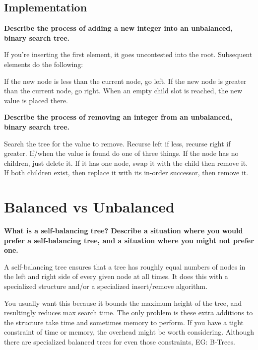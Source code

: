 \documentclass[12pt, letterpaper]{article}
\newcommand{\question}[1]{\textbf{#1}\par}
\newenvironment{answerblock}{\color{Green4}}{\normalcolor\vspace{1em}}
\begin{document}
\subsection{Implementation}

\question{Describe the process of adding a new integer into an unbalanced,
binary search tree.}

\begin{answerblock}
If you're inserting the first element, it goes uncontested into the root.
Subsequent elements do the following:

If the new node is less than the current node, go left. If the new node is
greater than the current node, go right. When an empty child slot is reached,
the new value is placed there.
\end{answerblock}

\question{Describe the process of removing an integer from an unbalanced,
binary search tree.}

\begin{answerblock}
Search the tree for the value to remove. Recurse left if less, recurse right if
greater. If/when the value is found do one of three things. If the node has no
children, just delete it. If it has one node, swap it with the child then
remove it. If both children exist, then replace it with its in-order successor,
then remove it.
\end{answerblock}

\pagebreak
\section{Balanced vs Unbalanced}

\question{What is a self-balancing tree? Describe a situation where you would
prefer a self-balancing tree, and a situation where you might not prefer one.}

\begin{answerblock}
A self-balancing tree ensures that a tree has roughly equal numbers of nodes in
the left and right side of every given node at all times. It does this with a
specialized structure and/or a specialized insert/remove algorithm.

You usually want this because it bounds the maximum height of the tree, and
resultingly reduces max search time. The only problem is these extra additions
to the structure take time and sometimes memory to perform. If you have a tight
constraint of time or memory, the overhead might be worth considering. Although
there are specialized balanced trees for even those constraints, EG: B-Trees.
\end{answerblock}
\end{document}

